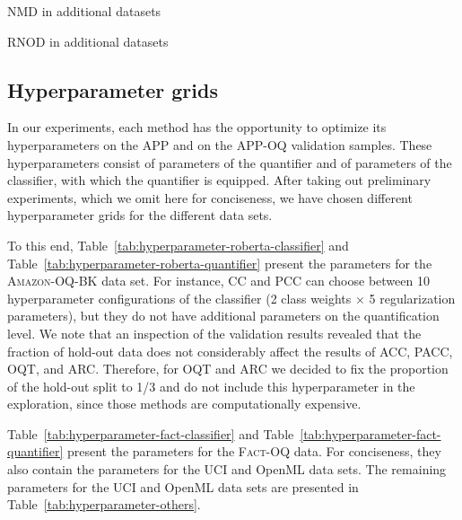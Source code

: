 \documentclass[10pt,a4paper]{article}
\begin{document}
\begin{table}
 \centering
 \caption{NMD in additional datasets}
 \label{tab:main_others_nmd}
 \resizebox{\textwidth}{!}{  }%
\end{table}

\begin{table}
 \centering
 \caption{RNOD in additional datasets}
 \label{tab:main_others_rnod}
 \resizebox{\textwidth}{!}{  }%
\end{table}


\subsection{Hyperparameter grids}

\noindent In our experiments, each method has the opportunity to
optimize its hyperparameters on the APP and on the APP-OQ validation
samples. These hyper\-pa\-ra\-me\-ters consist of parameters of the
quantifier and of parameters of the classifier, with which the
quantifier is equipped. After taking out preliminary experiments,
which we omit here for conciseness, we have chosen different
hyperparameter grids for the different data sets.

To this end, Table~\ref{tab:hyperparameter-roberta-classifier} and
Table~\ref{tab:hyperparameter-roberta-quantifier} present the
parameters for the \textsc{Amazon-OQ-BK} data set. For instance, CC
and PCC can choose between 10 hyperparameter configurations of the
classifier (2 class weights $\times$ 5 regularization parameters), but
they do not have additional parameters on the quantification level. We
note that an inspection of the validation results revealed that the
fraction of hold-out data does not considerably affect the results of
ACC, PACC, OQT, and ARC. Therefore, for OQT and ARC we decided to fix the proportion of the hold-out split to 1/3 and do not include this hyperparameter in the exploration, since those methods are computationally expensive.%

Table~\ref{tab:hyperparameter-fact-classifier} and
Table~\ref{tab:hyperparameter-fact-quantifier} present the parameters
for the \textsc{Fact-OQ} data. For conciseness, they also contain the
parameters for the UCI and OpenML data sets. The remaining parameters
for the UCI and OpenML data sets are presented in
Table~\ref{tab:hyperparameter-others}.
\end{document}
